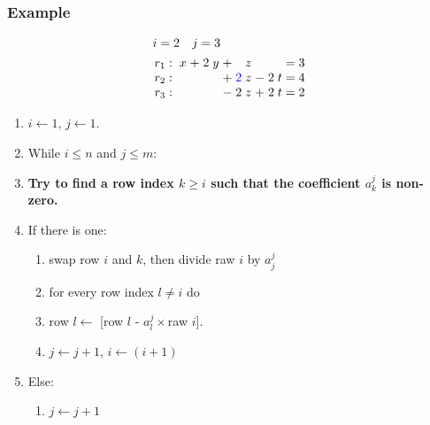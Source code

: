 \documentclass{beamer}
\begin{document}
\begin{frame}
  \frametitle{Example}
  
  \[\arraycolsep=1.4pt
  \begin{aligned}
    &i = 2 \quad j = 3\\
      &
    \begin{array}{lcccccccccccccc}
        r_1  & : &  & x & + & 2 & y & + &  & z &  & & & = & 3\\
        r_2 & : &   &   &  &   &  & + & {\color{blue}2} & z & - & 2 & t  & = & 4\\
        r_3  & : &  &   &  &   &   & - & 2 & z & + & 2 & t & = & 2\\
    \end{array}
  \end{aligned}
  \]
  
  
  \begin{enumerate}
  \item $i \leftarrow 1$, $j \leftarrow 1$.
  \item While $i \le n$ and $j \le m$:
  \item {\bf Try to find a row index $k \ge i$ such that the coefficient $a^j_k$ is non-zero.}
  \item If there is one:
    \begin{enumerate}
    \item swap row $i$ and $k$, then divide raw $i$ by $a^{j}_j$
    \item for every row index $l \neq i$ do 
    \item row $l \leftarrow$ [row $l$ - $a^j_l\times$raw $i$].
    \item $j \leftarrow j+1$, $i \leftarrow (i+1)$
    \end{enumerate}
  \item Else:
    \begin{enumerate}
    \item $j \leftarrow j+1$
    \end{enumerate}
  \end{enumerate}
  
\end{frame}
\end{document}
